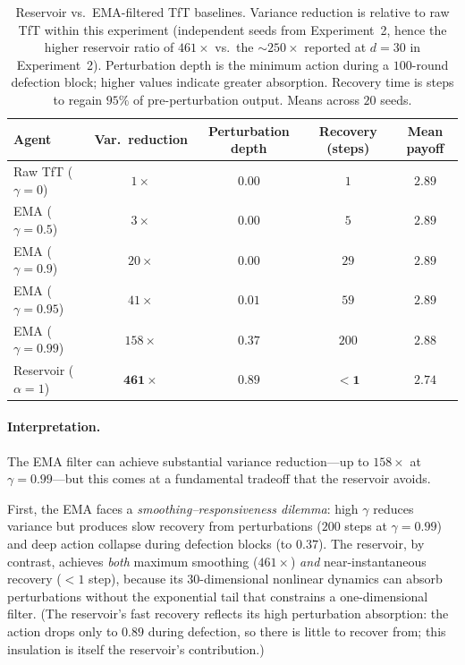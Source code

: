 \documentclass[11pt,a4paper]{article}
\theoremstyle{definition}
\begin{document}
\begin{table}[htbp]
\centering
\caption{Reservoir vs.\ EMA-filtered TfT baselines.  Variance reduction is
  relative to raw TfT within this experiment (independent seeds from
  Experiment~2, hence the higher reservoir ratio of $461\times$ vs.\
  the $\sim 250\times$ reported at $d = 30$ in Experiment~2).
  Perturbation depth is the minimum action during a
  $100$-round defection block; higher values indicate greater absorption.
  Recovery time is steps to regain $95\%$ of pre-perturbation output.
  Means across $20$ seeds.}
\label{tab:ema_baseline}
\begin{tabular}{lcccc}
\toprule
Agent & Var.\ reduction & Perturbation depth & Recovery (steps) & Mean payoff \\
\midrule
Raw TfT ($\gamma = 0$) & $1\times$ & $0.00$ & $1$ & $2.89$ \\
EMA ($\gamma = 0.5$) & $3\times$ & $0.00$ & $5$ & $2.89$ \\
EMA ($\gamma = 0.9$) & $20\times$ & $0.00$ & $29$ & $2.89$ \\
EMA ($\gamma = 0.95$) & $41\times$ & $0.01$ & $59$ & $2.89$ \\
EMA ($\gamma = 0.99$) & $158\times$ & $0.37$ & $200$ & $2.88$ \\
\midrule
Reservoir ($\alpha = 1$) & $\mathbf{461\times}$ & $\mathbf{0.89}$ & $\mathbf{< 1}$ & $2.74$ \\
\bottomrule
\end{tabular}
\end{table}

\paragraph{Interpretation.}
The EMA filter can achieve substantial variance reduction---up to $158\times$
at $\gamma = 0.99$---but this comes at a fundamental tradeoff that the reservoir
avoids.

First, the EMA faces a \emph{smoothing--responsiveness dilemma}: high $\gamma$
reduces variance but produces slow recovery from perturbations ($200$ steps at
$\gamma = 0.99$) and deep action collapse during defection blocks (to $0.37$).
The reservoir, by contrast, achieves \emph{both} maximum smoothing ($461\times$)
\emph{and} near-instantaneous recovery ($< 1$ step), because its $30$-dimensional
nonlinear dynamics can absorb perturbations without the exponential tail that
constrains a one-dimensional filter.
(The reservoir's fast recovery reflects its high perturbation absorption:
the action drops only to $0.89$ during defection, so there is little
to recover from; this insulation is itself the reservoir's contribution.)
\end{document}
